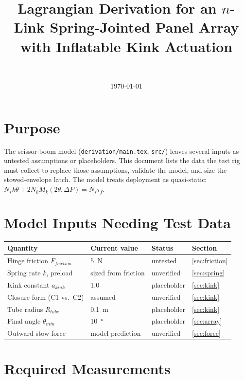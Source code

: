 \documentclass[11pt]{article}
\title{Lagrangian Derivation for an $n$-Link Spring-Jointed Panel Array\\
\large with Inflatable Kink Actuation}
\author{\Name\\ \course}
\date{\today}
\begin{document}
\maketitle
\section{Purpose}

The scissor-boom model (\texttt{derivation/main.tex}, \texttt{src/}) leaves several inputs as
untested assumptions or placeholders. This document lists the data the test rig must collect to
replace those assumptions, validate the model, and size the stowed-envelope latch. The model treats
deployment as quasi-static: $N_s k\theta + 2N_k M_k(2\theta,\Delta P) = N_s\tau_f$.

\section{Model Inputs Needing Test Data}

\begin{center}
\begin{tabular}{llll}
\toprule
Quantity & Current value & Status & Section \\
\midrule
Hinge friction $F_{friction}$ & \SI{5}{N} & untested & \ref{sec:friction} \\
Spring rate $k$, preload & sized from friction & unverified & \ref{sec:spring} \\
Kink constant $a_{kink}$ & 1.0 & placeholder & \ref{sec:kink} \\
Closure form (C1 vs.\ C2) & assumed & unverified & \ref{sec:kink} \\
Tube radius $R_{tube}$ & \SI{0.1}{m} & placeholder & \ref{sec:kink} \\
Final angle $\theta_{min}$ & \SI{10}{\degree} & placeholder & \ref{sec:array} \\
Outward stow force & model prediction & unverified & \ref{sec:force} \\
\bottomrule
\end{tabular}
\end{center}

\section{Required Measurements}
\end{document}
